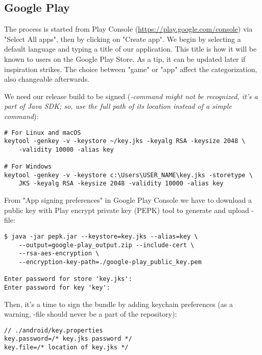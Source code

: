 
\subsection{Google Play}

The process is started from Play Console (\href{https://play.google.com/console}{https://play.google.com/console}) 
via "Select All apps", then by clicking on "Create app". We begin by selecting a default language and typing a 
title of our application. This title is how it will be known to users on the Google Play Store. As a tip, it can be 
updated later if inspiration strikes. The choice between "game" or "app" affect the categorization, also changeable 
afterwards.

We need our release build to be signed (\emph{-command might not be recognized, it's a part of Java SDK; so,
use the full path of its location instead of a simple command}):

\begin{lstlisting}[language=terminal]
# For Linux and macOS
keytool -genkey -v -keystore ~/key.jks -keyalg RSA -keysize 2048 \
    -validity 10000 -alias key

# For Windows
keytool -genkey -v -keystore c:\Users\USER_NAME\key.jks -storetype \
    JKS -keyalg RSA -keysize 2048 -validity 10000 -alias key
\end{lstlisting}

\noindent From "App signing preferences" in Google Play Console we have to download a public key with Play encrypt 
private key (PEPK) tool to generate and upload -file:

\begin{lstlisting}[language=terminal]
$ java -jar pepk.jar --keystore=key.jks --alias=key \
    --output=google-play_output.zip --include-cert \
    --rsa-aes-encryption \
    --encryption-key-path=./google-play_public_key.pem 

Enter password for store 'key.jks':
Enter password for key 'key':
\end{lstlisting}

\noindent Then, it's a time to sign the bundle by adding keychain preferences (as a warning, -file 
should never be a part of the repository):

\begin{lstlisting}
// ./android/key.properties
key.password=/* key.jks password */
key.file=/* location of key.jks */
\end{lstlisting}

